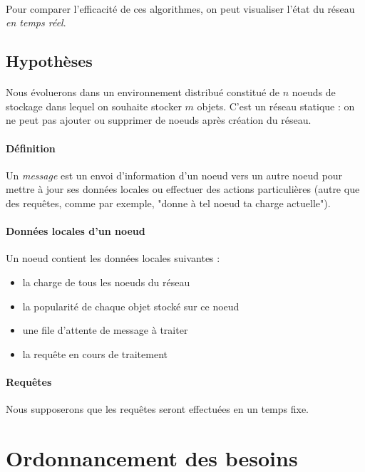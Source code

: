 \documentclass[12pt]{article}
\begin{document}
\paragraph{} Pour comparer l'efficacité de ces algorithmes, on peut visualiser l'état du réseau \textit{en temps réel}.


\subsection{Hypothèses}

\paragraph{} Nous évoluerons dans un environnement distribué constitué de $n$ noeuds de stockage dans lequel on souhaite stocker $m$ objets. C'est un réseau statique : on ne peut pas ajouter ou supprimer de noeuds après création du réseau.

\paragraph{Définition} Un \textit{message} est un envoi d'information d'un noeud vers un autre noeud pour mettre à jour ses données locales ou effectuer des actions particulières (autre que des requêtes, comme par exemple, "donne à tel noeud ta charge actuelle").

\paragraph{Données locales d'un noeud} Un noeud contient les données locales suivantes :
\begin{itemize}
 \item la charge de tous les noeuds du réseau
 \item la popularité de chaque objet stocké sur ce noeud
 \item une file d'attente de message à traiter
 \item la requête en cours de traitement
\end{itemize}

\paragraph{Requêtes} Nous supposerons que les requêtes seront effectuées en un temps fixe.

\newpage
\section{Ordonnancement des besoins}
\end{document}
